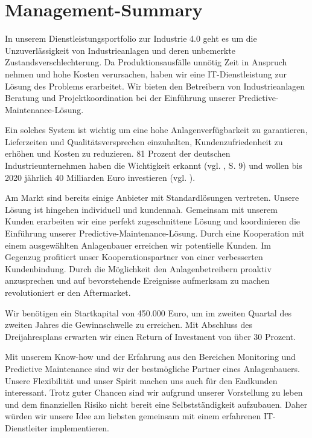 \section{Management-Summary}

In unserem Dienstleistungsportfolio zur Industrie 4.0 geht es um die Unzuverlässigkeit von Industrieanlagen und deren unbemerkte Zustandsverschlechterung. Da Produktionsausfälle unnötig Zeit in Anspruch nehmen und hohe Kosten verursachen, haben wir eine IT-Dienstleistung zur Lösung des Problems erarbeitet. Wir bieten den Betreibern von Industrieanlagen Beratung und Projektkoordination bei der Einführung unserer Predictive-Maintenance-Lösung.

Ein solches System ist wichtig um eine hohe Anlagenverfügbarkeit zu garantieren, Lieferzeiten und Qualitätsversprechen einzuhalten, Kundenzufriedenheit zu erhöhen und Kosten zu reduzieren. 81 Prozent der deutschen Industrieunternehmen haben die Wichtigkeit erkannt (vgl. \cite{SasForsa}, S. 9) und wollen bis 2020 jährlich 40 Milliarden Euro investieren (vgl. \cite{IndustrieHohesPotenzial}).

Am Markt sind bereits einige Anbieter mit Standardlösungen vertreten. Unsere Lösung ist hingehen individuell und kundennah. Gemeinsam mit unserem Kunden erarbeiten wir eine perfekt zugeschnittene Lösung und koordinieren die Einführung unserer Predictive-Maintenance-Lösung. Durch eine Kooperation mit einem ausgewählten Anlagenbauer erreichen wir potentielle Kunden. Im Gegenzug profitiert unser Kooperationspartner von einer verbesserten Kundenbindung. Durch die Möglichkeit den Anlagenbetreibern proaktiv anzusprechen und auf bevorstehende Ereignisse aufmerksam zu machen revolutioniert er den Aftermarket.

Wir benötigen ein Startkapital von 450.000 Euro, um im zweiten Quartal des zweiten Jahres die Gewinnschwelle zu erreichen. Mit Abschluss des Dreijahresplans erwarten wir einen Return of Investment von über 30 Prozent.

Mit unserem Know-how und der Erfahrung aus den Bereichen Monitoring und Predictive Maintenance sind wir der bestmögliche Partner eines Anlagenbauers. Unsere Flexibilität und unser Spirit machen uns auch für den Endkunden interessant. Trotz guter Chancen sind wir aufgrund unserer Vorstellung zu leben und dem finanziellen Risiko nicht bereit eine Selbstständigkeit aufzubauen. Daher würden wir unsere Idee am liebsten gemeinsam mit einem erfahrenen IT-Dienstleiter implementieren.
